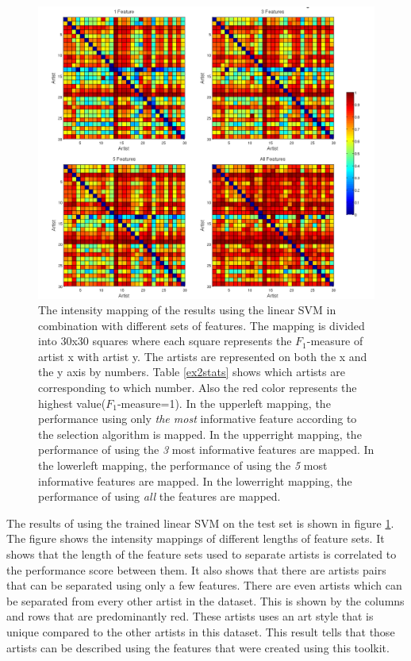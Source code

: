 
\begin{figure}[htb]
  \centering
  \includegraphics[width=0.75\linewidth]{img/experiment2results.png}
  \caption{The intensity mapping of the results using the linear SVM in combination with different sets of features.
  The mapping is divided into 30x30 squares where each square represents the $F_1$-measure of artist x with artist y.
  The artists are represented on both the x and the y axis by numbers.
  Table \ref{ex2stats} shows which artists are corresponding to which number.
  Also the red color represents the highest value($F_1$-measure=1).
  In the upperleft mapping, the performance using only \textit{the most} informative feature according to the selection algorithm is mapped.
  In the upperright mapping, the performance of using the \textit{3} most informative features are mapped.
  In the lowerleft mapping, the performance of using the \textit{5} most informative features are mapped.
  In the lowerright mapping, the performance of using \textit{all} the features are mapped.
  }
  \label{fig:experiment2results}
\end{figure}

The results of using the trained linear SVM on the test set is shown in figure \ref{fig:experiment2results}.
The figure shows the intensity mappings of different lengths of feature sets.
It shows that the length of the feature sets used to separate artists is correlated to the performance score between them.
It also shows that there are artists pairs that can be separated using only a few features.
There are even artists which can be separated from every other artist in the dataset.
This is shown by the columns and rows that are predominantly red.
These artists uses an art style that is unique compared to the other artists in this dataset.
This result tells that those artists can be described using the features that were created using this toolkit.

